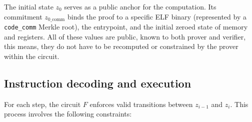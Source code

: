 The initial state $z_0$ serves as a public anchor for the computation. Its
commitment $z_{0\_\text{comm}}$ binds the proof to a specific ELF binary
(represented by a \texttt{code\_comm} Merkle root), the entrypoint, and the
initial zeroed state of memory and registers. All of these values are public,
known to both prover and verifier, this means, they do not have to be recomputed
or constrained by the prover within the circuit.

\subsection{Instruction decoding and execution}

For each step, the circuit $F$ enforces valid transitions between $z_{i-1}$
and $z_i$. This process involves the following constraints:

